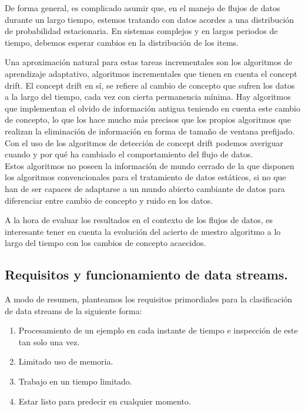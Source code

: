 De forma general, es complicado asumir que, en el manejo de flujos de datos durante un largo tiempo, estemos tratando con datos acordes a una distribución de probabilidad
estacionaria. En sistemas complejos y en largos periodos de tiempo, debemos esperar cambios en la distribución de los items.

Una aproximación natural para estas tareas incrementales son los algoritmos de aprendizaje adaptativo, algoritmos incrementales que tienen en cuenta el concept drift.
El concept drift en sí, se refiere al cambio de concepto que sufren los datos a la largo del tiempo, cada vez con cierta permanencia mínima.
Hay algoritmos que implementan el olvido de información antigua teniendo en cuenta este cambio de concepto, lo que los hace mucho más precisos que los propios algoritmos
que realizan la eliminación de información en forma de tamaño de ventana prefijado.\\
Con el uso de los algoritmos de detección de concept drift podemos averiguar cuando y por qué ha cambiado el comportamiento del flujo de datos.\\
Estos algoritmos no poseen la información de mundo cerrado de la que disponen los algoritmos convencionales para el tratamiento de datos estáticos, si no que han de ser
capaces de adaptarse a un mundo abierto cambiante de datos para diferenciar entre cambio de concepto y ruido en los datos.

A la hora de evaluar los resultados en el contexto de los flujos de datos, es interesante tener en cuenta la evolución del acierto de nuestro algoritmo a lo largo del tiempo
con los cambios de concepto acaecidos.



\subsection{Requisitos y funcionamiento de data streams.}

A modo de resumen, planteamos los requisitos primordiales para la clasificación de data streams de la siguiente forma:
\begin{enumerate}
	\item Procesamiento de un ejemplo en cada instante de tiempo e inspección de este tan solo una vez.
	\item Limitado uso de memoria.
	\item Trabajo en un tiempo limitado.
	\item Estar listo para predecir en cualquier momento.
\end{enumerate}

